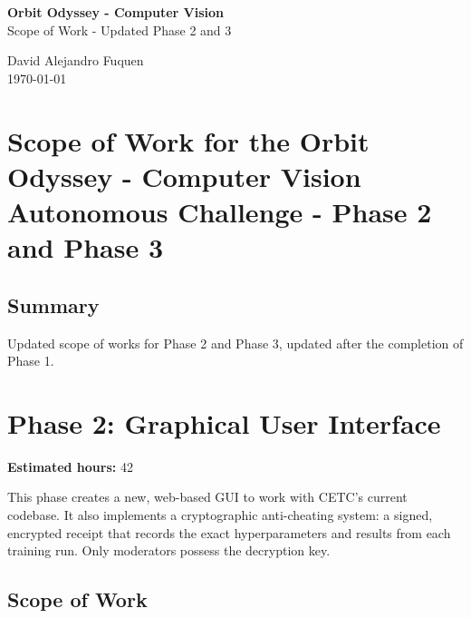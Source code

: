 \documentclass[a4]{article}
\begin{document}
\thispagestyle{fancy}

\begin{center}
    \textbf{\large Orbit Odyssey - Computer Vision} \\
    {Scope of Work - Updated Phase 2 and 3}
    
    \vspace{0.7em}

    David Alejandro Fuquen \\

    {\small \today}

\end{center}

\section*{Scope of Work for the Orbit Odyssey - Computer Vision Autonomous Challenge - Phase 2 and Phase 3}

\subsection*{Summary}
Updated scope of works for Phase 2 and Phase 3, updated after the completion of Phase 1.



\section*{Phase 2: Graphical User Interface}

\noindent \textbf{Estimated hours:} 42 \hfill 

\vspace{0.5em}

This phase creates a new, web-based GUI to work with CETC's current codebase. It also implements a cryptographic anti-cheating system: a signed, encrypted receipt that records the exact hyperparameters and results from each training run. Only moderators possess the decryption key.

\subsection*{Scope of Work}
\end{document}
